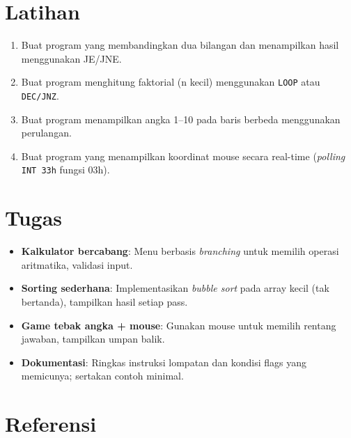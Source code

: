 \section{Latihan}
\begin{enumerate}
  \item Buat program yang membandingkan dua bilangan dan menampilkan hasil menggunakan JE/JNE.
  \item Buat program menghitung faktorial (n kecil) menggunakan \texttt{LOOP} atau \texttt{DEC/JNZ}.
  \item Buat program menampilkan angka 1--10 pada baris berbeda menggunakan perulangan.
  \item Buat program yang menampilkan koordinat mouse secara real-time (\textit{polling} \texttt{INT 33h} fungsi 03h).
\end{enumerate}

\section{Tugas}
\begin{itemize}
  \item \textbf{Kalkulator bercabang}: Menu berbasis \textit{branching} untuk memilih operasi aritmatika, validasi input.
  \item \textbf{Sorting sederhana}: Implementasikan \textit{bubble sort} pada array kecil (tak bertanda), tampilkan hasil setiap pass.
  \item \textbf{Game tebak angka + mouse}: Gunakan mouse untuk memilih rentang jawaban, tampilkan umpan balik.
  \item \textbf{Dokumentasi}: Ringkas instruksi lompatan dan kondisi flags yang memicunya; sertakan contoh minimal.
\end{itemize}

\section{Referensi}
